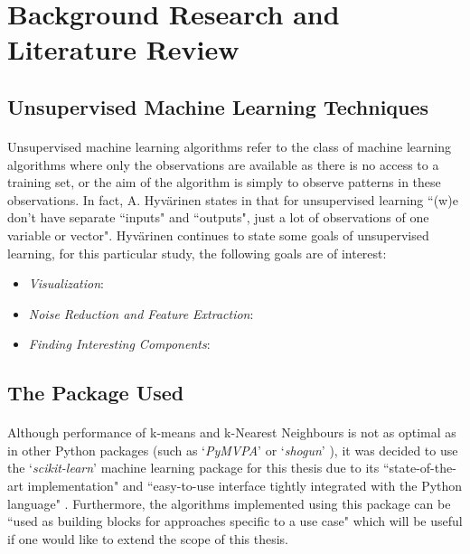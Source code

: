 \documentclass[12pt, twoside]{report}
\begin{document}
	
	\section{Background Research and Literature Review}
	\subsection{Unsupervised Machine Learning Techniques}
	\paragraph{ }Unsupervised machine learning algorithms refer to the class of machine learning algorithms where only the observations are available as there is no access to a training set, or the aim of the algorithm is simply to observe patterns in these observations. In fact, A. Hyv{\"a}rinen states in \cite{r:lecturenotes} that for unsupervised learning ``(w)e don't have separate ``inputs" and ``outputs", just a lot of observations of one variable or vector". Hyv{\"a}rinen continues to state some goals of unsupervised learning, for this particular study, the following goals are of interest:
	\begin{itemize}
		\item \textit{Visualization}:
		\item \textit{Noise Reduction and Feature Extraction}:
		\item \textit{Finding Interesting Components}:
	\end{itemize} 
	
		
	\subsection{The Package Used}
	\paragraph{ }Although performance of k-means and k-Nearest Neighbours is not as optimal as in other Python packages (such as `\textit{PyMVPA}' \cite{r:pymvpa} or `\textit{shogun}' \cite{r:shogun}), it was decided to use the `\textit{scikit-learn}' machine learning package for this thesis due to its ``state-of-the-art implementation" and ``easy-to-use interface tightly integrated with the Python language" \cite{r:sklearn}. Furthermore, the algorithms implemented using this package can be ``used as building blocks for approaches specific to a use case" \cite{r:sklearn} which will be useful if one would like to extend the scope of this thesis.
	
\end{document}

